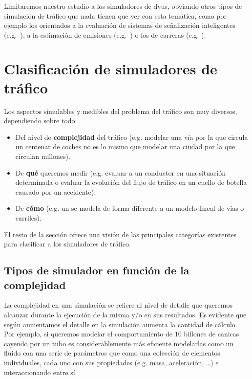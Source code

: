 Limitaremos nuestro estudio a los simuladores de \glspl{dvu}, obviando otros tipos de simulación de tráfico que nada tienen que ver con esta temática, como por ejemplo los orientados a la evaluación de sistemas de señalización inteligentes (e.g.~\cite{jin2016evaluation}), a la estimación de emisiones (e.g.~\cite{quaassdorff2016microscale}) o los de carreras (e.g. \cite{Wymann2013}).

\section{Clasificación de simuladores de tráfico}

Los aspectos simulables y medibles del problema del tráfico son muy diversos, dependiendo sobre todo:

\begin{itemize}
	\item Del nivel de \textbf{complejidad} del tráfico (e.g. modelar una vía por la que circula un centenar de coches no es lo mismo que modelar una ciudad por la que circulan millones).
	\item De \textbf{qué} queremos medir (e.g. evaluar a un conductor en una situación determinada o evaluar la evolución del flujo de tráfico en un cuello de botella causado por un accidente).
	\item De \textbf{cómo} (e.g. un  se modela de forma diferente a un modelo lineal de vías o carriles).
\end{itemize}

El resto de la sección ofrece una visión de las principales categorías existentes para clasificar a los simuladores de tráfico.

\subsection{Tipos de simulador en función de la complejidad}

La complejidad en una simulación se refiere al nivel de detalle que queremos alcanzar durante la ejecución de la misma y/o en sus resultados. Es evidente que según aumentamos el detalle en la simulación aumenta la cantidad de cálculo. Por ejemplo, si queremos modelar el comportamiento de $10$ billones de canicas cayendo por un tubo es considerablemente más eficiente modelarlas como un fluido con una serie de parámetros que como una colección de elementos individuales, cada uno con sus propiedades (e.g. masa, aceleración, \ldots) e interaccionando entre sí.

